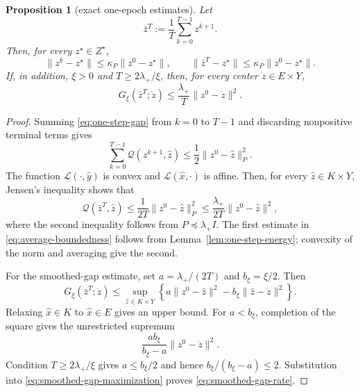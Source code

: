 \documentclass[letterpaper]{article} %
\newtheorem{proposition}[theorem]{Proposition}
\theoremstyle{definition}
\theoremstyle{remark}
\begin{document}
\begin{proposition}[exact one-epoch estimates]
\label{prop:one-epoch-estimates}
Let
\[
    \bar z^T
    :=
    \frac1T\sum_{k=0}^{T-1}z^{k+1}.
\]
Then, for every $z^\star\in Z^\star$,
\begin{equation}
\label{eq:average-boundedness}
    \|z^k-z^\star\|
    \le
    \kappa_P\|z^0-z^\star\|,
    \qquad
    \|\bar z^T-z^\star\|
    \le
    \kappa_P\|z^0-z^\star\|.
\end{equation}
If, in addition, $\xi>0$ and $T\ge2\lambda_+/\xi$, then, for every center
$\dot z\in E\times Y$,
\begin{equation}
\label{eq:smoothed-gap-rate}
    G_\xi(\bar z^T;\dot z)
    \le
    \frac{\lambda_+}{T}\|z^0-\dot z\|^2.
\end{equation}
\end{proposition}

\begin{proof}
Summing \eqref{eq:one-step-gap} from $k=0$ to $T-1$ and discarding
nonpositive terminal terms gives
\[
    \sum_{k=0}^{T-1}\mathcal Q(z^{k+1},\widehat z)
    \le
    \frac12\|z^0-\widehat z\|_P^2.
\]
The function $\mathcal L(\cdot,\widehat y)$ is convex and
$\mathcal L(\widehat x,\cdot)$ is affine.  Then, for every
$\widehat z\in K\times Y$, Jensen's inequality shows that
\begin{equation}
\label{eq:ordinary-gap-rate}
    \mathcal Q(\bar z^T,\widehat z)
    \le
    \frac{1}{2T}\|z^0-\widehat z\|_P^2
    \le
    \frac{\lambda_+}{2T}\|z^0-\widehat z\|^2,
\end{equation}
where the second inequality follows from $P\preceq\lambda_+I$.  The first
estimate in \eqref{eq:average-boundedness} follows from
Lemma~\ref{lem:one-step-energy}; convexity of the norm and averaging give the
second.

For the smoothed-gap estimate, set
$a=\lambda_+/(2T)$ and $b_\xi=\xi/2$.  Then
\begin{equation}
\label{eq:smoothed-gap-maximization}
    G_\xi(\bar z^T;\dot z)
    \le
    \sup_{\widehat z\in K\times Y}
    \left\{
        a\|z^0-\widehat z\|^2
        -
        b_\xi\|\widehat z-\dot z\|^2
    \right\}.
\end{equation}
Relaxing $\widehat x\in K$ to $\widehat x\in E$ gives an upper bound.  For
$a<b_\xi$, completion of the square gives the unrestricted supremum
\[
    \frac{ab_\xi}{b_\xi-a}\|z^0-\dot z\|^2.
\]
Condition $T\ge2\lambda_+/\xi$ gives $a\le b_\xi/2$ and hence
$b_\xi/(b_\xi-a)\le2$.  Substitution into
\eqref{eq:smoothed-gap-maximization} proves
\eqref{eq:smoothed-gap-rate}.
\end{proof}
\end{document}
